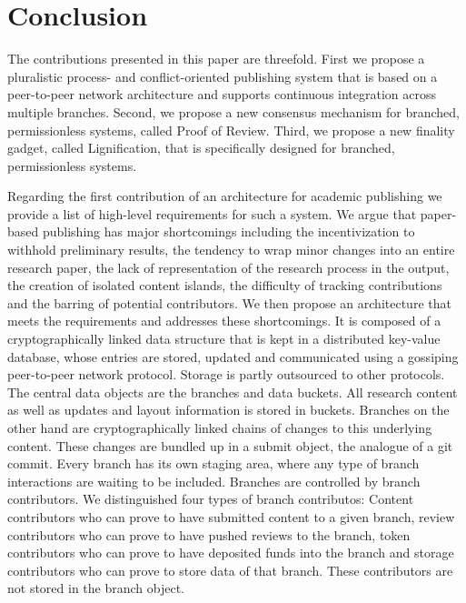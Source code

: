 \section{Conclusion}
\label{sc:conclusion}

The contributions presented in this paper are threefold. First we propose a pluralistic process- and conflict-oriented publishing system that is based on a peer-to-peer network architecture and supports continuous integration across multiple branches. Second, we propose a new consensus mechanism for branched, permissionless systems, called Proof of Review. Third, we propose a new finality gadget, called Lignification, that is specifically designed for branched, permissionless systems. 

Regarding the first contribution of an architecture for academic publishing we provide a list of high-level requirements for such a system. We argue that paper-based publishing has major shortcomings including the incentivization to withhold preliminary results, the tendency to wrap minor changes into an entire research paper, the lack of representation of the research process in the output, the creation of isolated content islands, the difficulty of tracking contributions and the barring of potential contributors. We then propose an architecture that meets the requirements and addresses these shortcomings. It is composed of a cryptographically linked data structure that is kept in a distributed key-value database, whose entries are stored, updated and communicated using a gossiping peer-to-peer network protocol. Storage is partly outsourced to other protocols. The central data objects are the branches and data buckets. All research content as well as updates and layout information is stored in buckets. Branches on the other hand are cryptographically linked chains of changes to this underlying content. These changes are bundled up in a submit object, the analogue of a git commit. Every branch has its own staging area, where any type of branch interactions are waiting to be included. Branches are controlled by branch contributors. We distinguished four types of branch contributos: Content contributors who can prove to have submitted content to a given branch, review contributors who can prove to have pushed reviews to the branch, token contributors who can prove to have deposited funds into the branch and storage contributors who can prove to store data of that branch. These contributors are not stored in the branch object.



